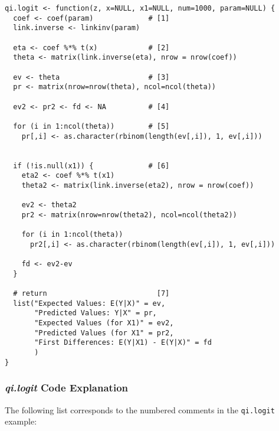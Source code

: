 \begin{verbatim}
qi.logit <- function(z, x=NULL, x1=NULL, num=1000, param=NULL) {
  coef <- coef(param)             # [1]
  link.inverse <- linkinv(param)

  eta <- coef %*% t(x)            # [2]
  theta <- matrix(link.inverse(eta), nrow = nrow(coef))

  ev <- theta                     # [3]
  pr <- matrix(nrow=nrow(theta), ncol=ncol(theta))

  ev2 <- pr2 <- fd <- NA          # [4]

  for (i in 1:ncol(theta))        # [5]
    pr[,i] <- as.character(rbinom(length(ev[,i]), 1, ev[,i]))


  if (!is.null(x1)) {             # [6]
    eta2 <- coef %*% t(x1)
    theta2 <- matrix(link.inverse(eta2), nrow = nrow(coef))

    ev2 <- theta2
    pr2 <- matrix(nrow=nrow(theta2), ncol=ncol(theta2))

    for (i in 1:ncol(theta))
      pr2[,i] <- as.character(rbinom(length(ev[,i]), 1, ev[,i]))

    fd <- ev2-ev
  }

  # return                          [7]
  list("Expected Values: E(Y|X)" = ev,
       "Predicted Values: Y|X" = pr,
       "Expected Values (for X1)" = ev2,
       "Predicted Values (for X1" = pr2,
       "First Differences: E(Y|X1) - E(Y|X)" = fd
       )
}

\end{verbatim}


\subsubsection{\emph{qi.logit} Code Explanation}

The following list corresponds to the numbered comments in the {\tt qi.logit} example:

